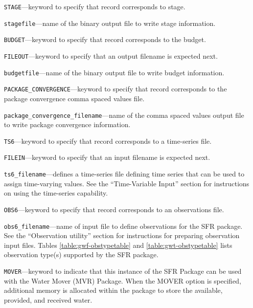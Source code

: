\begin{description}
\item \texttt{STAGE}---keyword to specify that record corresponds to stage.

\item \texttt{stagefile}---name of the binary output file to write stage information.

\item \texttt{BUDGET}---keyword to specify that record corresponds to the budget.

\item \texttt{FILEOUT}---keyword to specify that an output filename is expected next.

\item \texttt{budgetfile}---name of the binary output file to write budget information.

\item \texttt{PACKAGE\_CONVERGENCE}---keyword to specify that record corresponds to the package convergence comma spaced values file.

\item \texttt{package\_convergence\_filename}---name of the comma spaced values output file to write package convergence information.

\item \texttt{TS6}---keyword to specify that record corresponds to a time-series file.

\item \texttt{FILEIN}---keyword to specify that an input filename is expected next.

\item \texttt{ts6\_filename}---defines a time-series file defining time series that can be used to assign time-varying values. See the ``Time-Variable Input'' section for instructions on using the time-series capability.

\item \texttt{OBS6}---keyword to specify that record corresponds to an observations file.

\item \texttt{obs6\_filename}---name of input file to define observations for the SFR package. See the ``Observation utility'' section for instructions for preparing observation input files. Tables \ref{table:gwf-obstypetable} and \ref{table:gwt-obstypetable} lists observation type(s) supported by the SFR package.

\item \texttt{MOVER}---keyword to indicate that this instance of the SFR Package can be used with the Water Mover (MVR) Package.  When the MOVER option is specified, additional memory is allocated within the package to store the available, provided, and received water.


\end{description}
